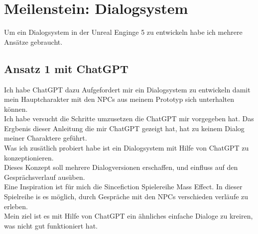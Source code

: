 \section {Meilenstein: Dialogsystem}
Um ein Dialogsystem in der Unreal Enginge 5 zu entwickeln habe ich mehrere Ansätze gebraucht.
 
\subsection{Ansatz 1 mit ChatGPT}
Ich habe ChatGPT dazu Aufgefordert mir ein Dialogsystem zu entwickeln damit mein Hauptcharakter mit den NPCs aus meinem Prototyp sich unterhalten können.
\\
Ich habe versucht die Schritte umzusetzen die ChatGPT mir vorgegeben hat. Das Ergbenis dieser Anleitung die mir ChatGPT gezeigt hat, hat zu keinem Dialog meiner Charaktere geführt.
\\
Was ich zusätlich probiert habe ist ein Dialogsystem mit Hilfe von ChatGPT zu konzeptionieren.
\\
Dieses Konzept soll mehrere Dialogversionen erschaffen, und einfluss auf den Gesprächsverlauf ausüben.
\\
Eine Inspiration ist für mich die Sincefiction Spielereihe Mass Effect. In dieser Spielreihe is es möglich, durch Gespräche mit den NPCs verschieden verläufe zu erleben.
\\
Mein ziel ist es mit Hilfe von ChatGPT ein ähnliches einfache Dialoge zu kreiren, was nicht gut funktioniert hat.
\\
